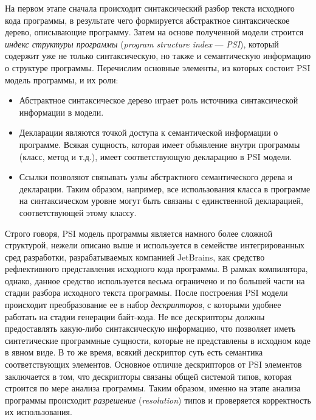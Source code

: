 На первом этапе сначала происходит синтаксический разбор текста исходного кода программы, в результате чего формируется абстрактное синтаксическое дерево, описывающие программу. Затем на основе полученной модели строится \emph{индекс структуры программы} (\emph{program structure index} --- \emph{PSI}), который содержит уже не только синтаксическую, но также и семантическую информацию о структуре программы. Перечислим основные элементы, из которых состоит PSI модель программы, и их роли:
\begin{itemize}
    \item Абстрактное синтаксическое дерево играет роль источника синтаксической информации в модели.
    \item Декларации являются точкой доступа к семантической информации о программе. Всякая сущность, которая имеет объявление внутри программы (класс, метод и т.д.), имеет соответствующую декларацию в PSI модели.
    \item Ссылки позволяют связывать узлы абстрактного семантического дерева и декларации. Таким образом, например, все использования класса в программе на синтаксическом уровне могут быть связаны с единственной декларацией, соответствующей этому классу. 
\end{itemize}
Строго говоря, PSI модель программы является намного более сложной структурой, нежели описано выше и используется в семействе интегрированных сред разработки, разрабатываемых компанией JetBrains, как средство рефлективного представления исходного кода программы. В рамках компилятора, однако, данное средство используется весьма ограничено и по большей части на стадии разбора исходного текста программы. После построения PSI модели происходит преобразование ее в набор \emph{дескрипторов}, с которыми удобнее работать на стадии генерации байт-кода. Не все дескрипторы должны предоставлять какую-либо синтаксическую информацию, что позволяет иметь синтетические программные сущности, которые не представлены в исходном коде в явном виде. В то же время, всякий дескриптор суть есть семантика соответствующих элементов. Основное отличие дескрипторов от PSI элементов заключается в том, что дескрипторы связаны общей системой типов, которая строится по мере анализа программы. Таким образом, именно на этапе анализа программы происходит \emph{разрешение} (\emph{resolution}) типов и проверяется корректность их использования. 

